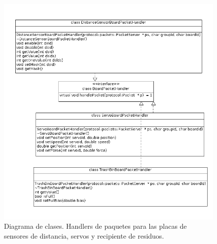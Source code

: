 \begin{figure}[ht]
	\centering
	\includegraphics[scale=0.52]{comportamientos/figures/cs6.png}
	\caption[Diagrama de clases: Handlers 2]{Diagrama de clases. Handlers de paquetes para las placas de sensores de 
	distancia, servos y recipiente de residuos.}
	\label{fig:handler_specific_2}
\end{figure}


